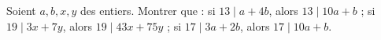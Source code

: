Soient $a, b, x, y$ des entiers. Montrer que : si $13 \mid a + 4b$, alors $13 \mid 10a + b$ ; si $19 \mid 3x + 7y$, alors $19 \mid 43x + 75y$ ; si $17 \mid 3a + 2b$, alors $17 \mid 10a + b$.

